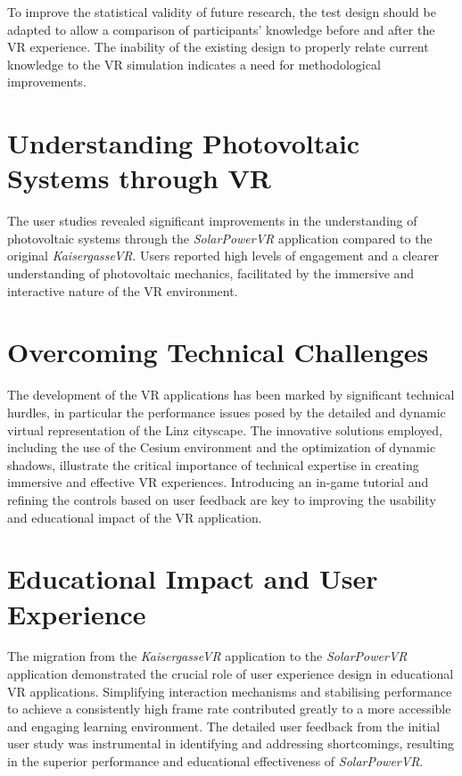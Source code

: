 \documentclass[draft, final]{vutinfth} %
\begin{document}
To improve the statistical validity of future research, the test design should be adapted to allow a comparison of participants' knowledge before and after the VR experience. The inability of the existing design to properly relate current knowledge to the VR simulation indicates a need for methodological improvements.

\section{Understanding Photovoltaic Systems through VR}
The user studies revealed significant improvements in the understanding of photovoltaic systems through the \textit{SolarPowerVR} application compared to the original \textit{KaisergasseVR}. Users reported high levels of engagement and a clearer understanding of photovoltaic mechanics, facilitated by the immersive and interactive nature of the VR environment.

\section{Overcoming Technical Challenges}
The development of the VR applications has been marked by significant technical hurdles, in particular the performance issues posed by the detailed and dynamic virtual representation of the Linz cityscape. The innovative solutions employed, including the use of the Cesium environment and the optimization of dynamic shadows, illustrate the critical importance of technical expertise in creating immersive and effective VR experiences. Introducing an in-game tutorial and refining the controls based on user feedback are key to improving the usability and educational impact of the VR application.

\section{Educational Impact and User Experience}
The migration from the \textit{KaisergasseVR} application to the \textit{SolarPowerVR} application demonstrated the crucial role of user experience design in educational VR applications. Simplifying interaction mechanisms and stabilising performance to achieve a consistently high frame rate contributed greatly to a more accessible and engaging learning environment. The detailed user feedback from the initial user study was instrumental in identifying and addressing shortcomings, resulting in the superior performance and educational effectiveness of \textit{SolarPowerVR}.
\end{document}
